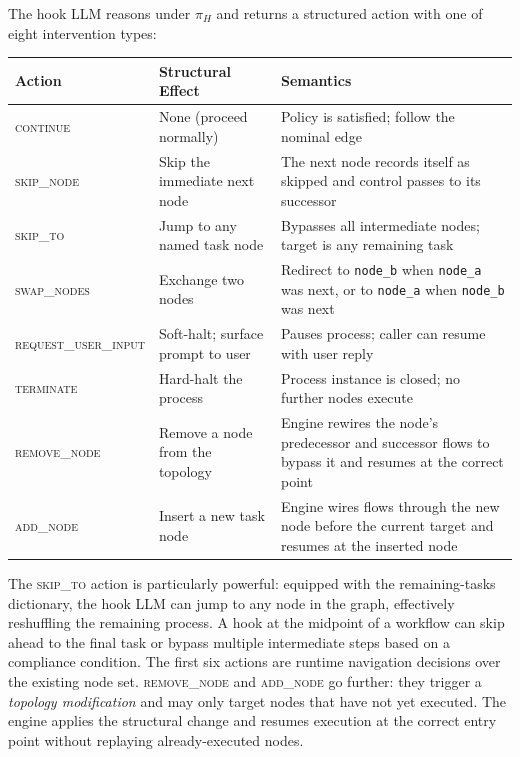 \documentclass[11pt,a4paper]{article}
\begin{document}
The hook LLM reasons under $\pi_H$ and returns a structured action with one of
eight intervention types:

\begin{center}
\small
\begin{tabularx}{\columnwidth}{@{}llX@{}}
\toprule
\textbf{Action} & \textbf{Structural Effect} & \textbf{Semantics} \\
\midrule
\textsc{continue}
  & None (proceed normally)
  & Policy is satisfied; follow the nominal edge \\[2pt]
\textsc{skip\_node}
  & Skip the immediate next node
  & The next node records itself as skipped and control passes to its
    successor \\[2pt]
\textsc{skip\_to}
  & Jump to any named task node
  & Bypasses all intermediate nodes; target is any remaining task \\[2pt]
\textsc{swap\_nodes}
  & Exchange two nodes
  & Redirect to \texttt{node\_b} when \texttt{node\_a} was next, or to
    \texttt{node\_a} when \texttt{node\_b} was next \\[2pt]
\textsc{request\_user\_input}
  & Soft-halt; surface prompt to user
  & Pauses process; caller can resume with user reply \\[2pt]
\textsc{terminate}
  & Hard-halt the process
  & Process instance is closed; no further nodes execute \\[2pt]
\textsc{remove\_node}
  & Remove a node from the topology
  & Engine rewires the node's predecessor and successor flows to bypass it
    and resumes at the correct point \\[2pt]
\textsc{add\_node}
  & Insert a new task node
  & Engine wires flows through the new node before the current target and
    resumes at the inserted node \\
\bottomrule
\end{tabularx}
\end{center}

\medskip
The \textsc{skip\_to} action is particularly powerful: equipped with the
remaining-tasks dictionary, the hook LLM can jump to any node in the graph,
effectively reshuffling the remaining process. A hook at the midpoint of a
workflow can skip ahead to the final task or bypass multiple intermediate steps
based on a compliance condition. The first six actions are runtime navigation
decisions over the existing node set. \textsc{remove\_node} and \textsc{add\_node}
go further: they trigger a \emph{topology modification} and may only target nodes
that have not yet executed. The engine applies the structural change and resumes
execution at the correct entry point without replaying already-executed nodes.
\end{document}
